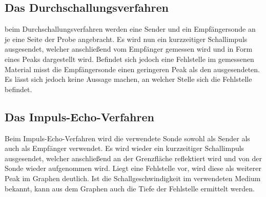 \subsection{Das Durchschallungsverfahren}
beim Durchschallungsverfahren werden eine Sender und ein Empfängersonde an je
eine Seite der Probe angebracht. Es wird nun ein kurzzeitiger Schallimpuls ausgesendet, welcher
anschließend vom Empfänger gemessen wird und in Form eines Peaks dargestellt wird.
Befindet sich jedoch eine Fehlstelle im gemessenen Material misst die Empfängersonde einen geringeren Peak als den ausgesendeten.
Es lässt sich jedoch keine Aussage machen, an welcher Stelle sich die Fehlstelle befindet.

\subsection{Das Impuls-Echo-Verfahren}
Beim Impuls-Echo-Verfahren wird die verwendete Sonde sowohl als Sender als auch
als Empfänger verwendet. Es wird wieder ein kurzzeitiger Schallimpuls ausgesendet,
welcher anschließend an der Grenzfläche reflektiert wird und von der Sonde wieder aufgenommen wird.
Liegt eine Fehlstelle vor, wird diese als weiterer Peak im Graphen deutlich. Ist
die Schallgeschwindigkeit im verwendeten Medium bekannt, kann aus dem Graphen
auch die Tiefe der Fehlstelle ermittelt werden. 
